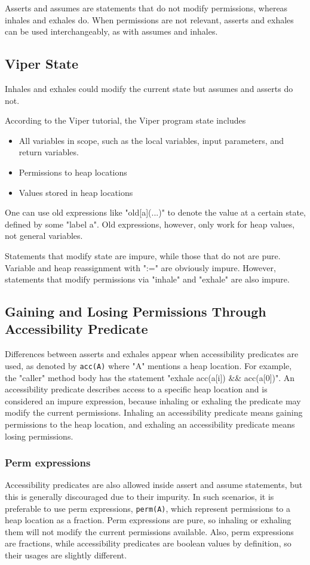 \documentclass[msc,oneside]{ubcthesis}
\theoremstyle{definition}
\begin{document}
Asserts and assumes are statements that do not modify permissions, whereas inhales and exhales do. When permissions are not relevant, asserts and exhales can be used interchangeably, as with assumes and inhales. 

\subsection{Viper State}
Inhales and exhales could modify the current state but assumes and asserts do not.

According to the Viper tutorial, the Viper program state includes 
\begin{itemize}
    \item All variables in scope, such as the local variables, input parameters, and return variables.  
    \item Permissions to heap locations
    \item Values stored in heap locations
\end{itemize}

One can use old expressions like "old[a](...)" to denote the value at a certain state, defined by some "label a". Old expressions, however, only work for heap values, not general variables.

Statements that modify state are impure, while those that do not are pure. Variable and heap reassignment with ":=" are obviously impure. However, statements that modify permissions via "inhale" and "exhale" are also impure.

\subsection{Gaining and Losing Permissions Through Accessibility Predicate}
Differences between asserts and exhales appear when accessibility predicates are used, as denoted by \lstinline{acc(A)} where "A" mentions a heap location. For example, the "caller" method body has the statement "exhale acc(a[i]) && acc(a[0])". An accessibility predicate describes access to a specific heap location and is considered an impure expression, because inhaling or exhaling the predicate may modify the current permissions. Inhaling an accessibility predicate means gaining permissions to the heap location, and exhaling an accessibility predicate means losing permissions. 

\subsubsection{Perm expressions}
Accessibility predicates are also allowed inside assert and assume statements, but this is generally discouraged due to their impurity. In such scenarios, it is preferable to use perm expressions, \lstinline{perm(A)}, which represent permissions to a heap location as a fraction. Perm expressions are pure, so inhaling or exhaling them will not modify the current permissions available. Also, perm expressions are fractions, while accessibility predicates are boolean values by definition, so their usages are slightly different.
\end{document}
